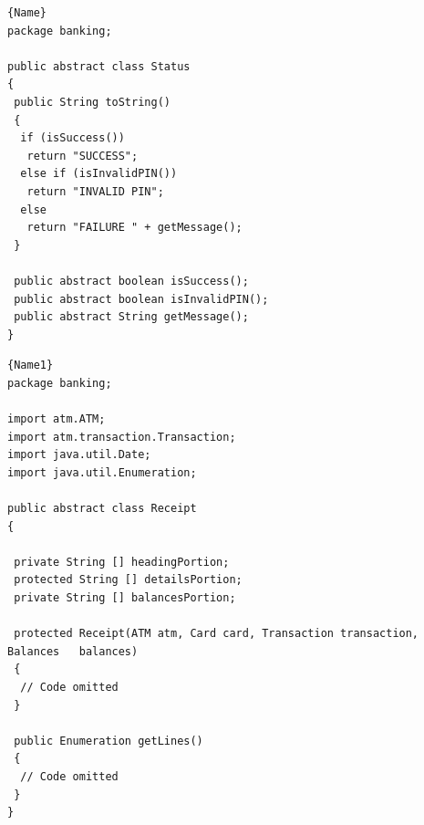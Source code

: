 \noindent\begin{minipage}{.45\textwidth}
\begin{lstlisting}[style=java,caption=Status.java,label=lst:Status]{Name}
package banking;

public abstract class Status
{
 public String toString()
 {
  if (isSuccess())
   return "SUCCESS";
  else if (isInvalidPIN())
   return "INVALID PIN";
  else
   return "FAILURE " + getMessage();
 }
    
 public abstract boolean isSuccess();
 public abstract boolean isInvalidPIN();
 public abstract String getMessage();
}
\end{lstlisting}
\end{minipage}\hfill
\begin{minipage}{.45\textwidth}
\begin{lstlisting}[style=java,caption=Receipt.java,label=lst:Receipt]{Name1}
package banking;

import atm.ATM;
import atm.transaction.Transaction;
import java.util.Date;
import java.util.Enumeration;

public abstract class Receipt
{

 private String [] headingPortion;
 protected String [] detailsPortion;
 private String [] balancesPortion;  
    
 protected Receipt(ATM atm, Card card, Transaction transaction, Balances   balances)
 {        
  // Code omitted
 }
     
 public Enumeration getLines()
 {
  // Code omitted
 }
}
\end{lstlisting}
\end{minipage}


